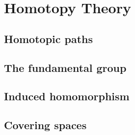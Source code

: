 \chapter{Homotopy Theory}
\section{Homotopic paths}
\section{The fundamental group}
\section{Induced homomorphism}
\section{Covering spaces}

